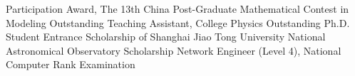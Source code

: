 \documentclass{resume}
\begin{document}
\begin{entries}
    {Participation Award,
      The 13th China Post-Graduate Mathematical Contest in Modeling}
    {Outstanding Teaching Assistant, College Physics}
    {Outstanding Ph.D. Student Entrance Scholarship of Shanghai Jiao Tong University}
    {National Astronomical Observatory Scholarship}
    {Network Engineer (Level 4), National Computer Rank Examination}
\end{entries}
\end{document}
